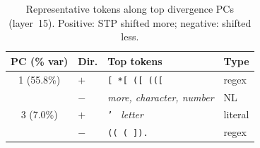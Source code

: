 \begin{table}[t]
\centering
\caption{Representative tokens along top divergence PCs (layer~15). Positive: STP shifted more; negative: shifted less.}
\label{tab:subspace}
\small
\setlength{\tabcolsep}{4pt}
\begin{tabular}{@{}clll@{}}
\toprule
\textbf{PC (\% var)} & \textbf{Dir.} & \textbf{Top tokens} & \textbf{Type} \\
\midrule
1 (55.8\%) & $+$ & \texttt{[ \; *[ \; ([ \; (([} & regex \\
             & $-$ & \emph{more, character, number} & NL \\
\midrule
3 (7.0\%)   & $+$ & \texttt{' \;} \emph{letter} & literal \\
             & $-$ & \texttt{(( \; ( \; ]).} & regex \\
\bottomrule
\end{tabular}
\end{table}
